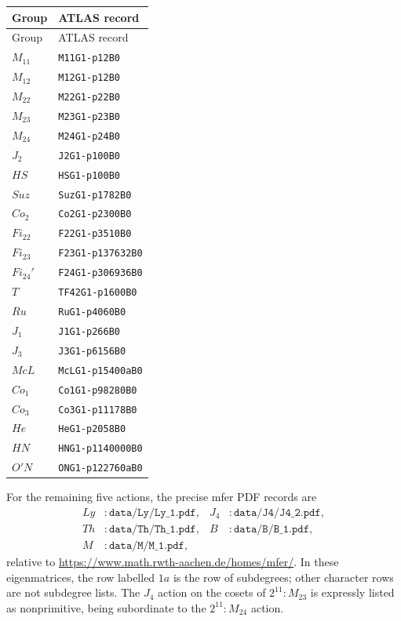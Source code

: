 \documentclass[11pt]{article}
\theoremstyle{definition}
\begin{document}
\begin{center}\small
\begin{longtable}{ll}
\toprule Group & ATLAS record\\\midrule\endfirsthead
\toprule Group & ATLAS record\\\midrule\endhead
$M_{11}$ & \texttt{M11G1-p12B0}\\
$M_{12}$ & \texttt{M12G1-p12B0}\\
$M_{22}$ & \texttt{M22G1-p22B0}\\
$M_{23}$ & \texttt{M23G1-p23B0}\\
$M_{24}$ & \texttt{M24G1-p24B0}\\
$J_2$ & \texttt{J2G1-p100B0}\\
$HS$ & \texttt{HSG1-p100B0}\\
$Suz$ & \texttt{SuzG1-p1782B0}\\
$Co_2$ & \texttt{Co2G1-p2300B0}\\
$Fi_{22}$ & \texttt{F22G1-p3510B0}\\
$Fi_{23}$ & \texttt{F23G1-p137632B0}\\
$Fi_{24}'$ & \texttt{F24G1-p306936B0}\\
$T$ & \texttt{TF42G1-p1600B0}\\
$Ru$ & \texttt{RuG1-p4060B0}\\
$J_1$ & \texttt{J1G1-p266B0}\\
$J_3$ & \texttt{J3G1-p6156B0}\\
$McL$ & \texttt{McLG1-p15400aB0}\\
$Co_1$ & \texttt{Co1G1-p98280B0}\\
$Co_3$ & \texttt{Co3G1-p11178B0}\\
$He$ & \texttt{HeG1-p2058B0}\\
$HN$ & \texttt{HNG1-p1140000B0}\\
$O'N$ & \texttt{ONG1-p122760aB0}\\
\bottomrule
\end{longtable}
\end{center}
For the remaining five actions, the precise mfer PDF records are
\begin{align*}
Ly &: \texttt{data/Ly/Ly\_1.pdf}, & J_4 &: \texttt{data/J4/J4\_2.pdf},\\
Th &: \texttt{data/Th/Th\_1.pdf}, & B &: \texttt{data/B/B\_1.pdf},\\
M &: \texttt{data/M/M\_1.pdf},
\end{align*}
relative to \url{https://www.math.rwth-aachen.de/homes/mfer/}. In these eigenmatrices, the row labelled $1a$ is the row of subdegrees; other character rows are not subdegree lists. The $J_4$ action on the cosets of $2^{11}:M_{23}$ is expressly listed as nonprimitive, being subordinate to the $2^{11}:M_{24}$ action.
\end{document}
